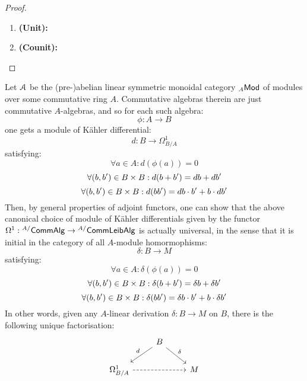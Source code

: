                    \begin{proof}
                        \noindent
                        \begin{enumerate}
                            \item \textbf{(Unit):} 
                            \item \textbf{(Counit):} 
                        \end{enumerate}
                    \end{proof}
                \begin{corollary} \label{coro: kahler_differential_universal_property}
                    Let $\mathcal{A}$ be the (pre-)abelian linear symmetric monoidal category ${}_A\mathsf{Mod}$ of modules over some commutative ring $A$. Commutative algebras therein are just commutative $A$-algebras, and so for each such algebra:
                        $$\phi: A \to B$$
                    one gets a module of K\"ahler differential:
                        $$d: B \to \Omega^1_{B/A}$$
                    satisfying:
                        $$\forall a \in A: d\left(\phi(a)\right) = 0$$
                        $$\forall (b, b') \in B \x B: d(b + b') = db + db'$$
                        $$\forall (b, b') \in B \x B: d(bb') = db \cdot b' + b \cdot db'$$
                    Then, by general properties of adjoint functors, one can show that the above canonical choice of module of K\"ahler differentials given by the functor $\Omega^1: {}^{A/}\mathsf{Comm}\mathsf{Alg} \to {}^{A/}\mathsf{Comm}\mathsf{Leib}\mathsf{Alg}$ is actually universal, in the sense that it is initial in the category of all $A$-module homormophisms:
                        $$\delta: B \to M$$
                    satisfying:
                        $$\forall a \in A: \delta\left(\phi(a)\right) = 0$$
                        $$\forall (b, b') \in B \x B: \delta(b + b') = \delta b + \delta b'$$
                        $$\forall (b, b') \in B \x B: \delta(bb') = \delta b \cdot b' + b \cdot \delta b'$$
                    In other words, given any $A$-linear derivation $\delta: B \to M$ on $B$, there is the following unique factorisation:
                        $$
                            \begin{tikzcd}
                            	 & B \\
                            	{\Omega^1_{B/A}} && M
                            	\arrow["\delta", from=1-2, to=2-3]
                            	\arrow["d"', from=1-2, to=2-1]
                            	\arrow[dashed, from=2-1, to=2-3]
                            \end{tikzcd}
                        $$
                \end{corollary}
                

